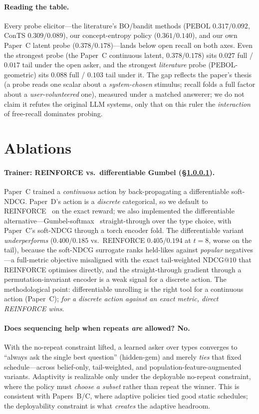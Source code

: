 \documentclass[11pt]{article}
\makeatletter
\newcommand{\ndcg}{\mathrm{NDCG@}10}
\makeatother
\begin{document}
\paragraph{Reading the table.} Every probe elicitor---the literature's BO/bandit methods (PEBOL $0.317/0.092$, ConTS
$0.309/0.089$), our concept-entropy policy ($0.361/0.140$), and our own Paper~C latent probe ($0.378/0.178$)---lands
below open recall on both axes. Even the strongest probe (the Paper~C continuous latent, $0.378/0.178$) sits $0.027$
full / $0.017$ tail under the open asker, and the strongest \emph{literature} probe (PEBOL-geometric) sits $0.088$ full
/ $0.103$ tail under it. The gap reflects the paper's thesis (a probe reads one scalar about a
\emph{system-chosen} stimulus; recall folds a full factor about a \emph{user-volunteered} one), measured under a matched
answerer; we do not claim it refutes the original LLM systems, only that on this ruler the \emph{interaction} of
free-recall dominates probing.

\section{Ablations}
\label{sec:ablations}
\paragraph{Trainer: REINFORCE vs.\ differentiable Gumbel (\S\ref{sec:trainer}).}
\label{sec:trainer}
Paper~C trained a \emph{continuous} action by back-propagating a differentiable soft-NDCG. Paper~D's action is a
\emph{discrete} categorical, so we default to REINFORCE~\cite{williams92} on the exact reward; we also implemented the differentiable
alternative---Gumbel-softmax~\cite{jang17gumbel} straight-through over the type choice, with Paper~C's soft-NDCG through a torch encoder
fold. The differentiable variant \emph{underperforms} ($0.400/0.185$ vs.\ REINFORCE $0.405/0.194$ at $t{=}8$, worse on
the tail), because the soft-NDCG surrogate ranks held-likes against \emph{popular} negatives---a full-metric objective
misaligned with the exact tail-weighted $\ndcg$ that REINFORCE optimises directly, and the straight-through gradient
through a permutation-invariant encoder is a weak signal for a discrete action. The methodological point: differentiable
unrolling is the right tool for a continuous action (Paper~C); \emph{for a discrete action against an exact metric,
direct REINFORCE wins}.

\paragraph{Does sequencing help when repeats \emph{are} allowed? No.} With the no-repeat constraint lifted, a learned
asker over types converges to ``always ask the single best question'' (hidden-gem) and merely \emph{ties} that fixed
schedule---across belief-only, tail-weighted, and population-feature-augmented variants. Adaptivity is realizable only
under the deployable no-repeat constraint, where the policy must \emph{choose a subset} rather than repeat the winner.
This is consistent with Papers~B/C, where adaptive policies tied good static schedules; the deployability constraint is
what \emph{creates} the adaptive headroom.
\end{document}
